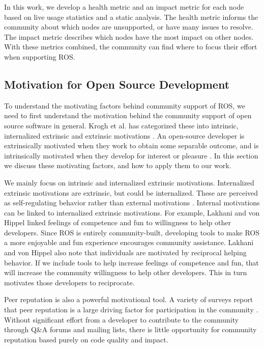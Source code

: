 \documentclass[letterpaper, 10 pt, conference]{ieeeconf}  %
\begin{document}
In this work, we develop a health metric and an impact metric for each node based on live usage statistics and a static analysis. The health metric informs the community about which nodes are unsupported, or have many issues to resolve. The impact metric describes which nodes have the most impact on other nodes. With these metrics combined, the community can find where to focus their effort when supporting ROS.

\subsection{Motivation for Open Source Development}

To understand the motivating factors behind community support of ROS, we need to first understand the motivation behind the community support of open source software in general. Krogh et al. has categorized these into intrinsic, internalized extrinsic and extrinsic motivations \cite{VonKrogh:2012:CRM:2481639.2481654}. An open-source developer is extrinsically motivated when they work to obtain some separable outcome, and is intrinsically motivated when they develop for interest or pleasure \cite{Deci_Motivation}. In this section we discuss these motivating factors, and how to apply them to our work.

We mainly focus on intrinsic and internalized extrinsic motivations. Internalized extrinsic motivations are extrinsic, but could be internalized. These are perceived as self-regulating behavior rather than external motivations \cite{Roberts:2006:UMP:1246148.1246151}. Internal motivations can be linked to internalized extrinsic motivations. For example, Lakhani and von Hippel \cite{Lakhani00howopen} linked feelings of competence and fun to willingness to help other developers. Since ROS is entirely community-built, developing tools to make ROS a more enjoyable and fun experience encourages community assistance. Lakhani and von Hippel also note that individuals are motivated by reciprocal helping behavior. If we include tools to help increase feelings of competence and fun, that will increase the community willingness to help other developers. This in turn motivates those developers to reciprocate.

Peer reputation is also a powerful motivational tool. A variety of surveys report that peer reputation is a large driving factor for participation in the community \cite{ghosh_understanding_2005, 927045, 33992}. Without significant effort from a developer to contribute to the community through Q\&A forums and mailing lists, there is little opportunity for community reputation based purely on code quality and impact.
\end{document}
